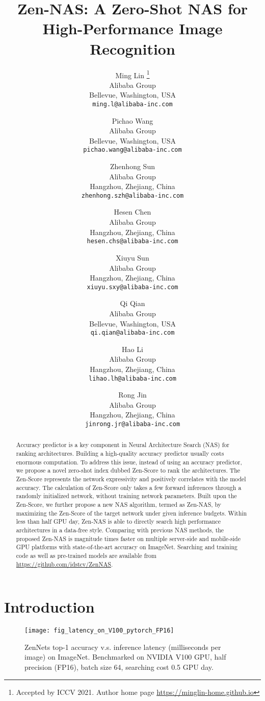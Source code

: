 \documentclass{article}
\title{Zen-NAS: A Zero-Shot NAS for High-Performance Image Recognition}
\author{Ming Lin \thanks{Accepted by ICCV 2021. Author home page \url{https://minglin-home.github.io}}\\
Alibaba Group\\
Bellevue, Washington, USA\\
{\tt\small ming.l@alibaba-inc.com}
\and
Pichao Wang\\
Alibaba Group\\
Bellevue, Washington, USA\\
{\tt\small pichao.wang@alibaba-inc.com}
\and
Zhenhong Sun\\
Alibaba Group\\
Hangzhou, Zhejiang, China\\
{\tt\small zhenhong.szh@alibaba-inc.com}
\and
Hesen Chen\\
Alibaba Group\\
Hangzhou, Zhejiang, China\\
{\tt\small hesen.chs@alibaba-inc.com}
\and
Xiuyu Sun\\
Alibaba Group\\
Hangzhou, Zhejiang, China\\
{\tt\small xiuyu.sxy@alibaba-inc.com}
\and
Qi Qian\\
Alibaba Group\\
Bellevue, Washington, USA\\
{\tt\small qi.qian@alibaba-inc.com}
\and
Hao Li\\
Alibaba Group\\
Hangzhou, Zhejiang, China\\
{\tt\small lihao.lh@alibaba-inc.com}
\and
Rong Jin\\
Alibaba Group\\
Hangzhou, Zhejiang, China\\
{\tt\small jinrong.jr@alibaba-inc.com}
}
\begin{document}
\maketitle


\begin{abstract}
  Accuracy predictor is a key component in Neural Architecture Search (NAS) for ranking architectures.  Building a high-quality accuracy predictor usually costs enormous computation. To address this issue, instead of using an  accuracy predictor, we propose a novel zero-shot index dubbed Zen-Score to rank the architectures. The Zen-Score represents the network expressivity and positively correlates with the model accuracy. The calculation of Zen-Score only takes a few forward inferences through a randomly initialized network, without training network parameters.   Built upon the Zen-Score, we further propose a new NAS algorithm, termed as Zen-NAS, by maximizing the Zen-Score of the target network under given inference budgets. Within less than half GPU day, Zen-NAS is able to directly search high performance architectures in a data-free style. Comparing with previous NAS methods, the proposed Zen-NAS is magnitude times faster on multiple server-side and mobile-side GPU platforms with state-of-the-art accuracy on ImageNet. Searching and training code as well as pre-trained models are available from \url{https://github.com/idstcv/ZenNAS}.
\end{abstract}



\section{Introduction}

\begin{figure}[!]
  \centering
  \texttt{[image: fig\_latency\_on\_V100\_pytorch\_FP16]}
  \caption{ZenNets top-1 accuracy v.s. inference latency (milliseconds per image) on ImageNet. Benchmarked on NVIDIA V100 GPU, half precision (FP16), batch size 64, searching cost 0.5 GPU day.} \label{fig:fig_latency_on_V100_pytorch_FP16}
\end{figure}
\end{document}
